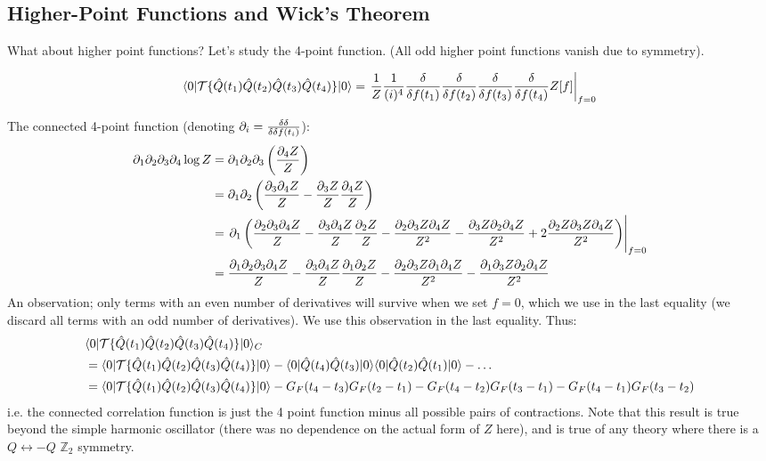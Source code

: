 \subsection{Higher-Point Functions and Wick's Theorem}
What about higher point functions? Let's study the 4-point function. (All odd higher point functions vanish due to symmetry).

\begin{equation}
    \langle 0 \rvert\mathcal{T}\{\hat{Q}(t_1)\hat{Q}(t_2)\hat{Q}(t_3)\hat{Q}(t_4)\}\lvert 0 \rangle = \left.\frac{1}{Z}\frac{1}{(i)^4}\frac{\delta }{\delta f(t_1)}\frac{\delta }{\delta f(t_2)}\frac{\delta }{\delta f(t_3)}\frac{\delta }{\delta f(t_4)} Z[f]\right|_{f=0}
\end{equation}

The connected 4-point function (denoting $\partial_i = \frac{\delta \delta}{\delta \delta f(t_i)}$):
\begin{equation}
    \begin{split}
        \partial_{1}\partial_{2}\partial_{3}\partial_{4}\log Z &= \partial_1\partial_2\partial_3\left(\frac{\partial_4 Z}{Z}\right) 
        \\ &= \partial_1\partial_2\left(\frac{\partial_3\partial_4 Z}{Z} - \frac{\partial_3 Z}{Z}\frac{\partial_4 Z}{Z}\right)
        \\ &= \left.\partial_1\left(\frac{\partial_2\partial_3\partial_4 Z}{Z} - \frac{\partial_3\partial_4 Z}{Z}\frac{\partial_2 Z}{Z} - \frac{\partial_2\partial_3 Z \partial_4 Z}{Z^2} - \frac{\partial_3 Z\partial_2\partial_4 Z}{Z^2} + 2\frac{\partial_2Z \partial_3 Z\partial_4 Z}{Z^2}\right)\right|_{f=0}
        \\ &= \frac{\partial_1\partial_2\partial_3\partial_4 Z}{Z} - \frac{\partial_3\partial_4 Z}{Z}\frac{\partial_1\partial_2 Z}{Z} - \frac{\partial_2\partial_3 Z \partial_1\partial_4 Z}{Z^2} - \frac{\partial_1 \partial_3 Z \partial_2 \partial_4 Z}{Z^2}
    \end{split}
\end{equation}
An observation; only terms with an even number of derivatives will survive when we set $f = 0$, which we use in the last equality (we discard all terms with an odd number of derivatives). We use this observation in the last equality. Thus:
\begin{equation}
    \begin{split}
        &\langle 0 \rvert\mathcal{T}\{\hat{Q}(t_1)\hat{Q}(t_2)\hat{Q}(t_3)\hat{Q}(t_4)\}\lvert 0 \rangle_C 
        \\ &= \langle 0 \rvert\mathcal{T}\{\hat{Q}(t_1)\hat{Q}(t_2)\hat{Q}(t_3)\hat{Q}(t_4)\}\lvert 0 \rangle - \langle 0 \rvert\hat{Q}(t_4)\hat{Q}(t_3)\lvert 0 \rangle\langle 0 \rvert\hat{Q}(t_2)\hat{Q}(t_1)\lvert 0 \rangle - \ldots
        \\ &= \langle 0 \rvert\mathcal{T}\{\hat{Q}(t_1)\hat{Q}(t_2)\hat{Q}(t_3)\hat{Q}(t_4)\}\lvert 0 \rangle - G_F(t_4-t_3)G_F(t_2-t_1) - G_F(t_4-t_2)G_F(t_3-t_1) - G_F(t_4-t_1)G_F(t_3-t_2)
    \end{split}
\end{equation}
i.e. the connected correlation function is just the 4 point function minus all possible pairs of contractions. Note that this result is true beyond the simple harmonic oscillator (there was no dependence on the actual form of $Z$ here), and is true of any theory where there is a $Q \leftrightarrow -Q$ $\mathbb{Z}_2$ symmetry.

